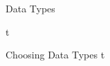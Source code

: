 \documentclass[../lecture2-variables.tex]{subfiles}
\begin{document}

\begin{frame}[fragile]{Data Types}

t

\end{frame}


\begin{frame}[fragile]{Choosing Data Types}
t
\end{frame}

\end{document}
